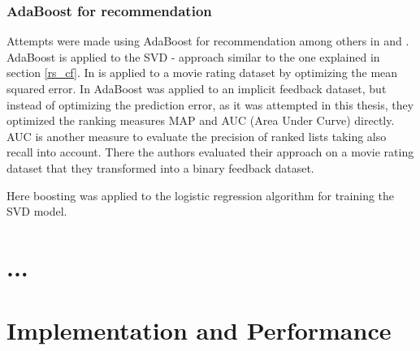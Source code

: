 \documentclass[10pt]{reportMaster}
\begin{document}
\subsection{AdaBoost for recommendation}
Attempts were made using AdaBoost for recommendation among others in \cite{boostingCFRatings} and \cite{boostingAUC}.
AdaBoost is applied to the SVD - approach similar to the one explained in section \ref{rs_cf}.
In \cite{boostingCFRatings} is applied to a movie rating dataset by optimizing the mean squared error. %
In \cite{boostingAUC} AdaBoost was applied to an implicit feedback dataset, but instead of optimizing the prediction error, as it was attempted in this thesis, they optimized the ranking measures MAP and AUC (Area Under Curve) directly.
AUC is another measure to evaluate the precision of ranked lists taking also recall into account. %
There the authors evaluated their approach on a movie rating dataset that they transformed into a binary feedback dataset.


Here boosting was applied to the logistic regression algorithm for training the SVD model.
















\chapter{...}












\chapter{Implementation and Performance}
\end{document}
